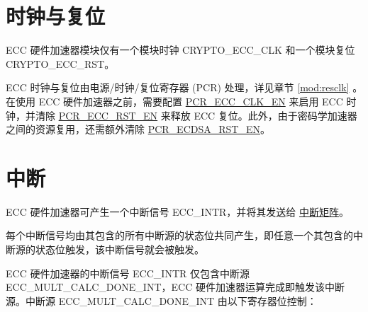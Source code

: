 \documentclass[main\_\_CN.tex]{subfiles}
\begin{document}

\section{时钟与复位}
\label{sec:ecc-clkrst}

\chipname{} ECC 硬件加速器模块仅有一个模块时钟 CRYPTO\_ECC\_CLK 和一个模块复位 CRYPTO\_ECC\_RST。

ECC 时钟与复位由电源/时钟/复位寄存器 (PCR) 处理，详见章节 \ref{mod:resclk} \textit{}。在使用 ECC 硬件加速器之前，需要配置 \hyperref[fielddesc:PCRECCCLKEN]{PCR\_ECC\_CLK\_EN} 来启用 ECC 时钟，并清除 \hyperref[fielddesc:PCRECCRSTEN]{PCR\_ECC\_RST\_EN} 来释放 ECC 复位。此外，由于密码学加速器之间的资源复用，还需额外清除 \hyperref[fielddesc:PCRECDSARSTEN]{PCR\_ECDSA\_RST\_EN}。


\section{中断}
\label{sec:ecc-interrupt}

\chipname{} ECC 硬件加速器可产生一个中断信号 ECC\_INTR，并将其发送给 \hyperref[mod:intmtrx]{中断矩阵}。

\begin{tiplisting}
每个中断信号均由其包含的所有中断源的状态位共同产生，即任意一个其包含的中断源的状态位触发，该中断信号就会被触发。
\end{tiplisting}

ECC 硬件加速器的中断信号 ECC\_INTR 仅包含中断源 \label{int:ECCMULTCALCDONEINT}ECC\_MULT\_CALC\_DONE\_INT，ECC 硬件加速器运算完成即触发该中断源。中断源 ECC\_MULT\_CALC\_DONE\_INT 由以下寄存器位控制：
\end{document}
